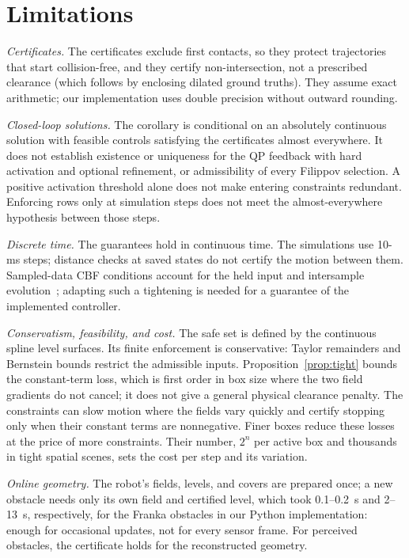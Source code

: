 \documentclass[journal]{IEEEtran}
\theoremstyle{definition}
\begin{document}
\section{Limitations}\label{sec:limits}
\emph{Certificates.} The certificates exclude first contacts, so they protect trajectories that
start collision-free, and they certify non-intersection, not a prescribed clearance (which follows
by enclosing dilated ground truths). They assume exact arithmetic; our implementation uses double
precision without outward rounding.

\emph{Closed-loop solutions.} The corollary is conditional on an absolutely continuous solution
with feasible controls satisfying the certificates almost everywhere. It does not establish
existence or uniqueness for the QP feedback with hard activation and optional refinement, or
admissibility of every Filippov selection. A positive activation threshold alone does not make
entering constraints redundant. Enforcing rows only at simulation steps does not meet the
almost-everywhere hypothesis between those steps.

\emph{Discrete time.} The guarantees hold in continuous time. The simulations use 10-ms steps;
distance checks at saved states do not certify the motion between them. Sampled-data CBF
conditions account for the held input and intersample evolution~\cite{breeden2022sampled};
adapting such a tightening is needed for a guarantee of the implemented controller.

\emph{Conservatism, feasibility, and cost.} The safe set is defined by the continuous spline level
surfaces. Its finite enforcement is conservative: Taylor remainders and Bernstein bounds restrict
the admissible inputs. Proposition~\ref{prop:tight} bounds the constant-term loss, which is first
order in box size where the two field gradients do not cancel; it does not give a general physical
clearance penalty. The constraints can slow motion where the fields vary quickly and certify
stopping only when their constant terms are nonnegative. Finer boxes reduce these losses at the
price of more constraints. Their number,
$2^n$ per active box and thousands in tight spatial scenes, sets the cost per step and its
variation.

\emph{Online geometry.} The robot's fields, levels, and covers are prepared once; a new obstacle needs
only its own field and certified level, which took 0.1--0.2~s and 2--13~s, respectively, for the
Franka obstacles in our Python implementation: enough for occasional updates, not for every sensor
frame. For perceived obstacles, the certificate holds for the reconstructed geometry.
\end{document}
